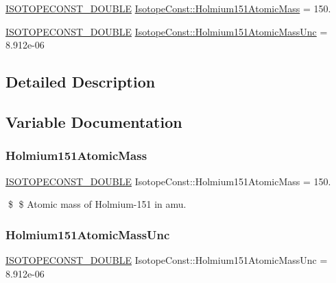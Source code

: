 \begin{DoxyCompactItemize}
\item 
\mbox{\hyperlink{group___isotope_const-_macros_ga8f45a7272ce02c0b4c65c44636ed719a}{I\+S\+O\+T\+O\+P\+E\+C\+O\+N\+S\+T\+\_\+\+D\+O\+U\+B\+LE}} \mbox{\hyperlink{group___isotope_const-_holmium-_ho151_gac3b90e4aa87a803a5b484ca58dafff94}{Isotope\+Const\+::\+Holmium151\+Atomic\+Mass}} = 150.
\item 
\mbox{\hyperlink{group___isotope_const-_macros_ga8f45a7272ce02c0b4c65c44636ed719a}{I\+S\+O\+T\+O\+P\+E\+C\+O\+N\+S\+T\+\_\+\+D\+O\+U\+B\+LE}} \mbox{\hyperlink{group___isotope_const-_holmium-_ho151_gad8dd5a13e8b250c498c6916514796beb}{Isotope\+Const\+::\+Holmium151\+Atomic\+Mass\+Unc}} = 8.\+912e-\/06
\end{DoxyCompactItemize}


\subsection{Detailed Description}


\subsection{Variable Documentation}
\mbox{\label{group___isotope_const-_holmium-_ho151_gac3b90e4aa87a803a5b484ca58dafff94}} 
\subsubsection{\texorpdfstring{Holmium151\+Atomic\+Mass}{Holmium151AtomicMass}}
{\footnotesize\ttfamily \mbox{\hyperlink{group___isotope_const-_macros_ga8f45a7272ce02c0b4c65c44636ed719a}{I\+S\+O\+T\+O\+P\+E\+C\+O\+N\+S\+T\+\_\+\+D\+O\+U\+B\+LE}} Isotope\+Const\+::\+Holmium151\+Atomic\+Mass = 150.}

\$ \$ Atomic mass of Holmium-\/151 in amu. \mbox{\label{group___isotope_const-_holmium-_ho151_gad8dd5a13e8b250c498c6916514796beb}} 
\subsubsection{\texorpdfstring{Holmium151\+Atomic\+Mass\+Unc}{Holmium151AtomicMassUnc}}
{\footnotesize\ttfamily \mbox{\hyperlink{group___isotope_const-_macros_ga8f45a7272ce02c0b4c65c44636ed719a}{I\+S\+O\+T\+O\+P\+E\+C\+O\+N\+S\+T\+\_\+\+D\+O\+U\+B\+LE}} Isotope\+Const\+::\+Holmium151\+Atomic\+Mass\+Unc = 8.\+912e-\/06}

